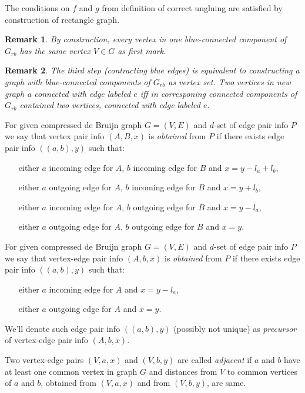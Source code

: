 \documentclass[12pt,a4paper,oneside]{article}
\newtheorem{remark}{Remark}
\begin{document}
The conditions on $f$ and $g$ from definition of correct ungluing are satisfied by construction of rectangle graph.

\begin{remark}
  By construction, every vertex in one blue-connected component of $G_{rb}$ has the same vertex $V \in G$ as first mark.
\end{remark}

\begin{remark}
 The third step (contracting blue edges) is equivalent to constructing a graph with blue-connected components of $G_{rb}$ as vertex set. Two vertices in new graph a connected with edge labeled $e$ iff in corresponing connected components of $G_{rb}$ contained two vertices, connected with edge labeled $e$.  
\end{remark}


For given compressed de Bruijn graph $G=(V,E)$ and $d$-set of edge pair info $P$ 
we say that vertex pair info $(A, B, x)$ is \emph{obtained} from $P$ if there exists edge pair info $((a,b),y)$ such that:
\begin{itemize}
\item[either] $a$ incoming edge for $A$, $b$ incoming edge for $B$ and $x=y-l_a+l_b$, 
\item[either] $a$ outgoing edge for $A$, $b$ incoming edge for $B$ and $x=y+l_b$, 
\item[either] $a$ incoming edge for $A$, $b$ outgoing edge for $B$ and $x=y-l_a$, 
\item[either] $a$ outgoing edge for $A$, $b$ outgoing edge for $B$ and $x=y$. 
\end{itemize} 

For given compressed de Bruijn graph $G=(V,E)$ and $d$-set of edge pair info $P$ 
we say that vertex-edge pair info $(A, b, x)$ is \emph{obtained} from $P$ if there exists edge pair info $((a,b),y)$ such that:
\begin{itemize}
\item[either] $a$ incoming edge for $A$ and $x=y-l_a$, 
\item[either] $a$ outgoing edge for $A$ and $x=y$. 
\end{itemize} 
We'll denote such edge pair info $((a, b), y)$ (possibly not unique) as \emph{precursor} of vertex-edge pair info $(A, b, x)$.

Two vertex-edge pairs $(V,a,x)$ and $(V,b,y)$ are called \emph{adjacent} if $a$ and $b$ have at least one common vertex in graph $G$ and distances from $V$ to common vertices of $a$ and $b$, obtained from $(V,a,x)$ and from $(V,b,y)$, are same. 
\end{document}
